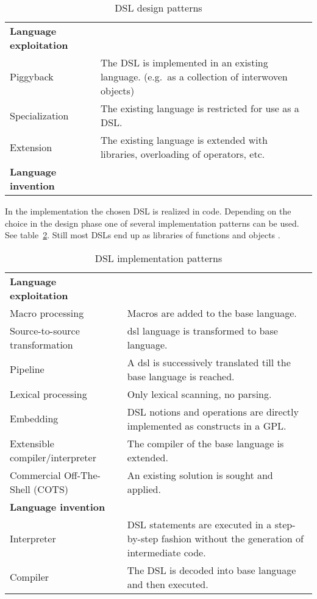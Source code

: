 \documentclass{scrartcl}
\begin{document}
\begin{table}[!ht]
    \center
    \begin{tabular}{lp{}}
\textbf{Language exploitation}&\\
Piggyback & The DSL is implemented in an existing language. (e.g.\ as a
collection of interwoven objects)\\
Specialization & The existing language is restricted for use as a DSL.\\
Extension & The existing language is extended with libraries, overloading of
operators, etc.\\[0.3cm]
\textbf{Language invention} & \\
    \end{tabular}
    \caption{DSL design patterns \cite{mernik2005and}}
    \label{tab:design_patterns}
\end{table}

In the implementation the chosen DSL is realized in code. Depending on the
choice in the design phase one of several implementation patterns can be used.
See table~\ref{tab:implementation_patterns}. Still most DSLs end up as
libraries of functions and objects \cite{van2000domain}.

\begin{table}[!ht]
    \center
    \begin{tabular}{lp{}}
\textbf{Language exploitation}&\\
Macro processing & Macros are added to the base language.\\
Source-to-source transformation & dsl language is transformed to base language.\\
Pipeline & A dsl is successively translated till the base language is reached.\\
Lexical processing & Only lexical scanning, no parsing.\\
Embedding & DSL notions and operations are directly implemented as
    constructs in a GPL.\\
Extensible compiler/interpreter & The compiler of the base language is
    extended.\\
Commercial Off-The-Shell (COTS) & An existing solution is sought and applied.\\[0.3cm]
    \textbf{Language invention}&\\
Interpreter & DSL statements are executed in a step-by-step fashion without the
    generation of intermediate code.\\
Compiler & The DSL is decoded into base language and then executed.\\
    \end{tabular}
    \caption{DSL implementation patterns \cite{mernik2005and}}
    \label{tab:implementation_patterns}
\end{table}
\end{document}
